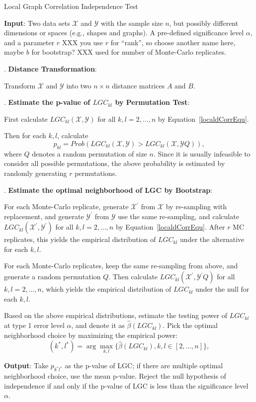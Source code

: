 \documentclass[11pt]{article}
\begin{document}
\begin{algorithm}
\label{algSRC}
\caption{Local Graph Correlation Independence Test} 
\begin{algorithmic} 
\State \textbf{Input}: Two data sets $\mathcal{X}$ and $\mathcal{Y}$ with the sample size $n$, but possibly different dimensions or spaces (e.g., shapes and graphs). A pre-defined significance level $\alpha$, and a parameter $r$ XXX you use $r$ for ``rank'', so choose another name here, maybe $b$ for bootstrap? XXX used for number of Monte-Carlo replicates.

. \textbf{Distance Transformation}:

Transform $\mathcal{X}$ and $\mathcal{Y}$ into two $n \times n$ distance matrices $A$ and $B$. 

. \textbf{Estimate the p-value of $LGC_{kl}$ by Permutation Test}: 

First calculate $LGC_{kl}(\mathcal{X}, \mathcal{Y})$ for all $k,l=2,\ldots,n$ by Equation~\eqref{localdCorrEqu}. 

Then for each $k,l$, calculate
\begin{equation}
\label{pvalue}
p_{kl}=Prob(LGC_{kl}(\mathcal{X}, \mathcal{Y})>LGC_{kl}(\mathcal{X}, \mathcal{Y}Q)),
\end{equation}
where $Q$ denotes a random permutation of size $n$. Since it is usually infeasible to consider all possible permutations, the above probability is estimated by randomly generating $r$ permutations.

. \textbf{Estimate the optimal neighborhood of LGC by Bootstrap}:

For each Monte-Carlo replicate, generate $\mathcal{X}^{'}$ from $\mathcal{X}$ by re-sampling with replacement, and generate $\mathcal{Y}^{'}$ from $\mathcal{Y}$ use the same re-sampling, and calculate $LGC_{kl}(\mathcal{X}^{'}, \mathcal{Y}^{'})$ for all $k,l=2,\ldots,n$ by Equation~\eqref{localdCorrEqu}. After $r$ MC replicates, this yields the empirical distribution of $LGC_{kl}$ under the alternative for each $k,l$.

For each Monte-Carlo replicates, keep the same re-sampling from above, and generate a random permutation $Q$. Then calculate $LGC_{kl}(\mathcal{X}^{'}, \mathcal{Y}^{'}Q)$ for all $k,l=2,\ldots,n$, which yields the empirical distribution of $LGC_{kl}$ under the null for each $k,l$.

Based on the above empirical distributions, estimate the testing power of $LGC_{kl}$ at type 1 error level $\alpha$, and denote it as $\hat{\beta}(LGC_{kl})$. Pick the optimal neighborhood choice by maximizing the empirical power:
\begin{equation}
\label{power}
(k^{*},l^{*})=\arg\max_{k,l}\{\hat{\beta}(LGC_{kl}), k,l\in [2,\ldots,n]\},
\end{equation}

\State \textbf{Output}: Take $p_{k^{*}l^{*}}$ as the p-value of LGC; if there are multiple optimal neighborhood choice, use the mean p-value. Reject the null hypothesis of independence if and only if the p-value of LGC is less than the significance level $\alpha$.
\end{algorithmic} 
\end{algorithm} 
\end{document}

